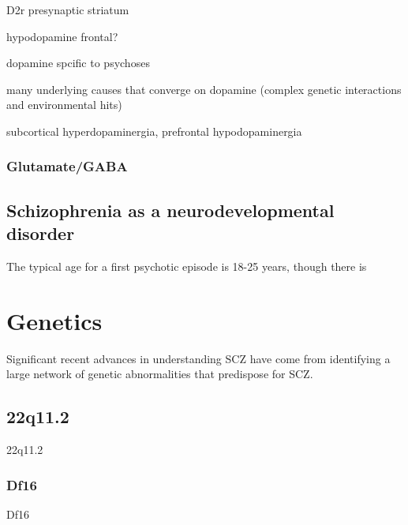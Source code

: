 D2r presynaptic striatum

hypodopamine frontal?

dopamine spcific to psychoses

many underlying causes that converge on dopamine (complex genetic interactions and environmental hits)

subcortical hyperdopaminergia, prefrontal hypodopaminergia

\subsubsection{Glutamate/GABA}
\subsection{Schizophrenia as a neurodevelopmental disorder}\label{sec:intro:SCZ:neurodevelopment}

The typical age for a first psychotic episode is 18-25 years, though there is 

\section{Genetics}
Significant recent advances in understanding SCZ have come from identifying a large network of genetic abnormalities that predispose for SCZ.
\subsection{22q11.2}
22q11.2
\subsubsection{Df16}
Df16
